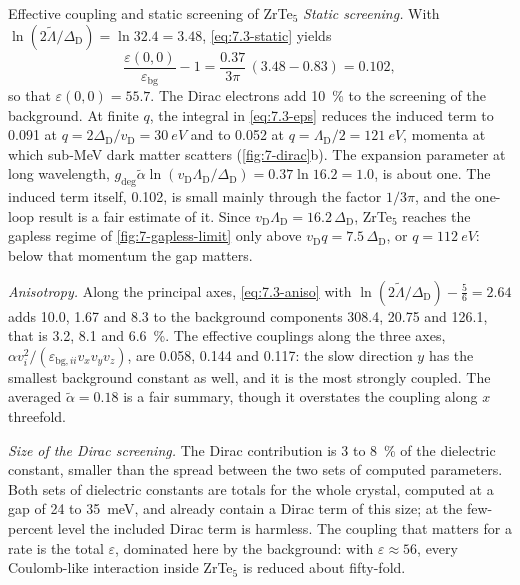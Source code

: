\begin{workedexample}{Effective coupling and static screening of ZrTe$_5$}
\emph{Static screening.} With $\ln(2\tilde\Lambda/\Delta_{\mathrm{D}}) = \ln 32.4 = 3.48$, \cref{eq:7.3-static} yields
\begin{equation*}
  \frac{\varepsilon(0,0)}{\varepsilon_{\mathrm{bg}}} - 1 = \frac{0.37}{3\pi}\,(3.48 - 0.83) = 0.102 ,
\end{equation*}
so that $\varepsilon(0,0) = 55.7$. The Dirac electrons add \SI{10}{\percent} to the screening of the background. At finite $q$, the integral in \cref{eq:7.3-eps} reduces the induced term to 0.091 at $q = 2\Delta_{\mathrm{D}}/v_{\mathrm{D}} = \SI{30}{eV}$ and to 0.052 at $q = \Lambda_{\mathrm{D}}/2 = \SI{121}{eV}$, momenta at which sub-MeV dark matter scatters (\cref{fig:7-dirac}b). The expansion parameter at long wavelength, $g_{\mathrm{deg}}\tilde\alpha\ln(v_{\mathrm{D}}\Lambda_{\mathrm{D}}/\Delta_{\mathrm{D}}) = 0.37\ln 16.2 = 1.0$, is about one. The induced term itself, 0.102, is small mainly through the factor $1/3\pi$, and the one-loop result is a fair estimate of it. Since $v_{\mathrm{D}}\Lambda_{\mathrm{D}} = 16.2\,\Delta_{\mathrm{D}}$, ZrTe$_5$ reaches the gapless regime of \cref{fig:7-gapless-limit} only above $v_{\mathrm{D}}q = 7.5\,\Delta_{\mathrm{D}}$, or $q = \SI{112}{eV}$: below that momentum the gap matters.

\emph{Anisotropy.} Along the principal axes, \cref{eq:7.3-aniso} with $\ln(2\tilde\Lambda/\Delta_{\mathrm{D}}) - \frac56 = 2.64$ adds 10.0, 1.67 and 8.3 to the background components 308.4, 20.75 and 126.1, that is 3.2, 8.1 and \SI{6.6}{\percent}. The effective couplings along the three axes, $\alpha v_i^2/(\varepsilon_{\mathrm{bg},ii}v_xv_yv_z)$, are 0.058, 0.144 and 0.117: the slow direction $y$ has the smallest background constant as well, and it is the most strongly coupled. The averaged $\tilde\alpha = 0.18$ is a fair summary, though it overstates the coupling along $x$ threefold.

\emph{Size of the Dirac screening.} The Dirac contribution is 3 to \SI{8}{\percent} of the dielectric constant, smaller than the spread between the two sets of computed parameters. Both sets of dielectric constants are totals for the whole crystal, computed at a gap of 24 to \SI{35}{meV}, and already contain a Dirac term of this size; at the few-percent level the included Dirac term is harmless. The coupling that matters for a rate is the total $\varepsilon$, dominated here by the background: with $\varepsilon \approx 56$, every Coulomb-like interaction inside ZrTe$_5$ is reduced about fifty-fold.
\end{workedexample}
